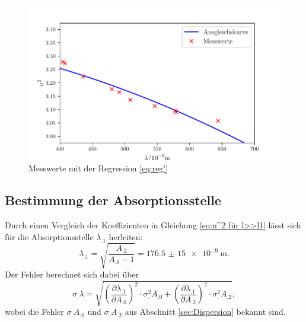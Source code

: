 \begin{figure}
\centering
\includegraphics[width=\linewidth-70pt,height=\textheight-70pt,keepaspectratio]{content/images/Graph11a.pdf}
\caption{Messwerte mit der Regression \eqref{eq:reg'}}
\label{fig:reg'}
\end{figure}

\subsection{Bestimmung der Absorptionsstelle}

Durch einen Vergleich der Koeffizienten in Gleichung \eqref{eq:n^2 für l>>l1} lässt sich für die Absorptionsstelle $\lambda_.1$ herleiten:
\[
\lambda_.1 = \sqrt{\frac{A_.2}{A_.0-1}}=\SI{176,5(15)e-9}{\metre}\text{.}
\]
Der Fehler berechnet sich dabei über
\[
\sigma_.{\lambda} =\sqrt{\left(\frac{\partial \lambda_.1}{\partial A_.0}\right)^2\cdot\sigma^2_.{A_.0}+\left(\frac{\partial\lambda_.1}{\partial A_.2}\right)^2\cdot\sigma^2_.{A_.2}},
\]
wobei die Fehler $\sigma_.{A_.0}$ und $\sigma_.{A_.2}$ aus Abschnitt \ref{sec:Dispersion} bekannt sind.

